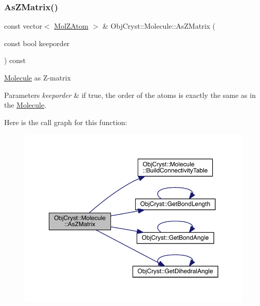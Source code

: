 \subsubsection{\texorpdfstring{AsZMatrix()}{AsZMatrix()}}
{\footnotesize\ttfamily const vector$<$ \mbox{\hyperlink{struct_obj_cryst_1_1_mol_z_atom}{Mol\+Z\+Atom}} $>$ \& Obj\+Cryst\+::\+Molecule\+::\+As\+Z\+Matrix (\begin{DoxyParamCaption}\item[{const bool}]{keeporder }\end{DoxyParamCaption}) const}

\mbox{\hyperlink{class_obj_cryst_1_1_molecule}{Molecule}} as Z-\/matrix


\begin{DoxyParams}{Parameters}
{\em keeporder} & if true, the order of the atoms is exactly the same as in the \mbox{\hyperlink{class_obj_cryst_1_1_molecule}{Molecule}}. \\
\hline
\end{DoxyParams}
Here is the call graph for this function\+:
\nopagebreak
\begin{figure}[H]
\begin{center}
\leavevmode
\includegraphics[width=350pt]{class_obj_cryst_1_1_molecule_a8700143ff56fc21bb1262c4d297802ce_cgraph}
\end{center}
\end{figure}
\mbox{\label{class_obj_cryst_1_1_molecule_ad6e27c1557962b32355eeadf1bf155d3}} 
